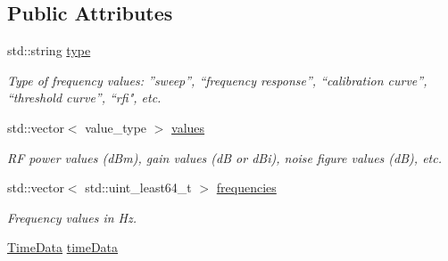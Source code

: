 \subsection*{Public Attributes}
\begin{DoxyCompactItemize}
\item 
\mbox{\label{structFreqValues_a457f391fad53ee1e8bca839dde90c5f1}} 
std\+::string \hyperlink{structFreqValues_a457f391fad53ee1e8bca839dde90c5f1}{type}
\begin{DoxyCompactList}\small\item\em Type of frequency values\+: ”sweep”, “frequency response”, “calibration curve”, “threshold curve”, “rfi", etc. \end{DoxyCompactList}\item 
\mbox{\label{structFreqValues_aeb9c44b6a1b0e5178053a85af0c89346}} 
std\+::vector$<$ value\+\_\+type $>$ \hyperlink{structFreqValues_aeb9c44b6a1b0e5178053a85af0c89346}{values}
\begin{DoxyCompactList}\small\item\em RF power values (d\+Bm), gain values (dB or d\+Bi), noise figure values (dB), etc. \end{DoxyCompactList}\item 
\mbox{\label{structFreqValues_a2b625831a46019f93a0999c1bed5c3a0}} 
std\+::vector$<$ std\+::uint\+\_\+least64\+\_\+t $>$ \hyperlink{structFreqValues_a2b625831a46019f93a0999c1bed5c3a0}{frequencies}
\begin{DoxyCompactList}\small\item\em Frequency values in Hz. \end{DoxyCompactList}\item 
\hyperlink{structTimeData}{Time\+Data} \hyperlink{structFreqValues_a4c97a4710c83078f5af5d92f2bedfe61}{time\+Data}
\end{DoxyCompactItemize}
